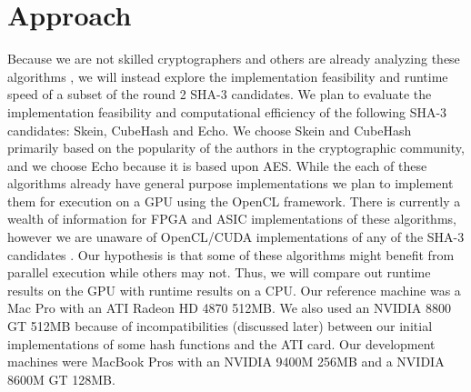 \section*{Approach}
Because we are not skilled cryptographers and others are already analyzing these algorithms \cite{Sha3Zoo}, we will instead explore the implementation feasibility and runtime speed of a subset of the round 2 SHA-3 candidates.
We plan to evaluate the implementation feasibility and computational efficiency of the following SHA-3 candidates: Skein, CubeHash and Echo.
We choose Skein and CubeHash primarily based on the popularity of the authors in the cryptographic community, and we choose Echo because it is based upon AES.
While the each of these algorithms already have general purpose implementations we plan to implement them for execution on a GPU using the OpenCL framework.
There is currently a wealth of information for FPGA and ASIC implementations of these algorithms, however we are unaware of OpenCL/CUDA implementations of any of the SHA-3 candidates \cite{Sha3Hardware}.
Our hypothesis is that some of these algorithms might benefit from parallel execution while others may not.
Thus, we will compare out runtime results on the GPU with runtime results on a CPU.
Our reference machine was a Mac Pro with an ATI Radeon HD 4870 512MB.
We also used an NVIDIA 8800 GT 512MB because of incompatibilities (discussed later) between our initial implementations of some hash functions and the ATI card.
Our development machines were MacBook Pros with an NVIDIA 9400M 256MB and a NVIDIA 8600M GT 128MB.